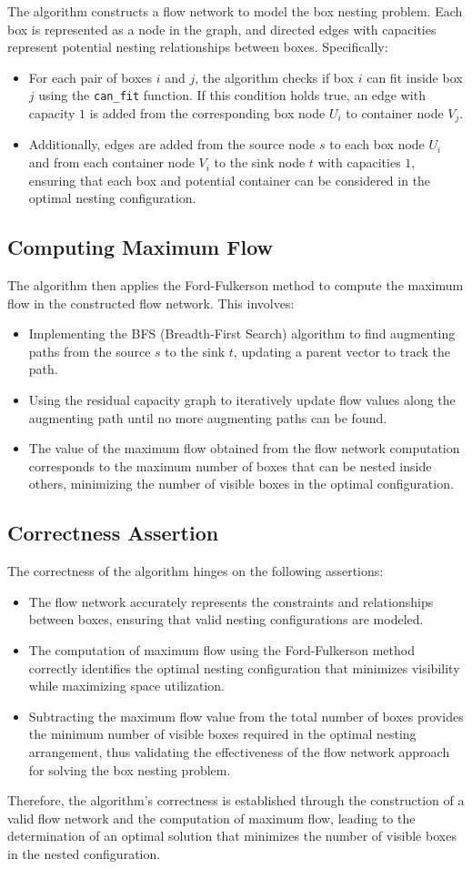 \documentclass{article}
\begin{document}
The algorithm constructs a flow network to model the box nesting problem. Each box is represented as a node in the graph, and directed edges with capacities represent potential nesting relationships between boxes. Specifically:
\begin{itemize}
    \item For each pair of boxes \(i\) and \(j\), the algorithm checks if box \(i\) can fit inside box \(j\) using the \texttt{can\_fit} function. If this condition holds true, an edge with capacity \(1\) is added from the corresponding box node \(U_i\) to container node \(V_j\).
    \item Additionally, edges are added from the source node \(s\) to each box node \(U_i\) and from each container node \(V_i\) to the sink node \(t\) with capacities \(1\), ensuring that each box and potential container can be considered in the optimal nesting configuration.
\end{itemize}

\subsection*{Computing Maximum Flow}

The algorithm then applies the Ford-Fulkerson method to compute the maximum flow in the constructed flow network. This involves:
\begin{itemize}
    \item Implementing the BFS (Breadth-First Search) algorithm to find augmenting paths from the source \(s\) to the sink \(t\), updating a parent vector to track the path.
    \item Using the residual capacity graph to iteratively update flow values along the augmenting path until no more augmenting paths can be found.
    \item The value of the maximum flow obtained from the flow network computation corresponds to the maximum number of boxes that can be nested inside others, minimizing the number of visible boxes in the optimal configuration.
\end{itemize}

\subsection*{Correctness Assertion}


The correctness of the algorithm hinges on the following assertions:
\begin{itemize}
    \item The flow network accurately represents the constraints and relationships between boxes, ensuring that valid nesting configurations are modeled.
    \item The computation of maximum flow using the Ford-Fulkerson method correctly identifies the optimal nesting configuration that minimizes visibility while maximizing space utilization.
    \item Subtracting the maximum flow value from the total number of boxes provides the minimum number of visible boxes required in the optimal nesting arrangement, thus validating the effectiveness of the flow network approach for solving the box nesting problem.
\end{itemize}

Therefore, the algorithm's correctness is established through the construction of a valid flow network and the computation of maximum flow, leading to the determination of an optimal solution that minimizes the number of visible boxes in the nested configuration.
\end{document}
